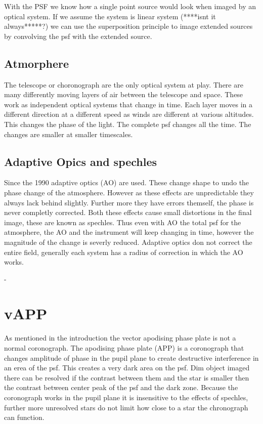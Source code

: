 With the PSF we know how a single point source would look when imaged by an optical system. If we assume the system is linear system (****isnt it always*****?) we can use the superposition principle to image extended sources by convolving the psf with the extended source. 

\subsection{Atmorphere}

The telescope or choronograph are the only optical system at play. There are many differently moving layers of air between the telescope and space. These work as independent optical systems that change in time. Each layer moves in a different direction at a different speed as winds are different at various altitudes. This changes the phase of the light. The complete psf changes all the time. The changes are smaller at smaller timescales. 

\subsection{Adaptive Opics and spechles}
Since the 1990 adaptive optics (AO) are used. These change shape to undo the phase change of the atmosphere. However as these effects are unpredictable they always lack behind slightly. Further more they have errors themself, the phase is never completly corrected. Both these effects cause small distortions in the final image, these are known as spechles. Thus even with AO the total psf for the atmosphere, the AO and the instrument will keep changing in time, however the magnitude of the change is severly reduced. Adaptive optics don not correct the entire field, generally each system has a radius of correction in which the AO works.




-

\section{vAPP}

As mentioned in the introduction the vector apodising phase plate is not a normal coronograph. The apodising phase plate (APP) is a coronograph that changes amplitude of phase in the pupil plane to create destructive interference in an erea of the psf. This creates a very dark area on the psf. Dim object imaged there can be resolved if the contrast between them and the star is smaller then the contrast between center peak of the psf and the dark zone. Because the coronograph works in the pupil plane it is insensitive to the effects of spechles, further more unresolved stars do not limit how close to a star the chronograph can function. %


